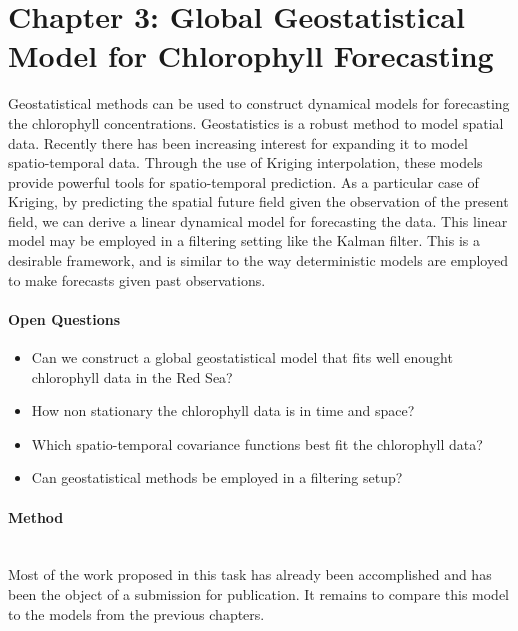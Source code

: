 \section{Chapter 3: Global Geostatistical Model for Chlorophyll Forecasting}

Geostatistical methods can be used to construct dynamical models for
forecasting the chlorophyll concentrations. Geostatistics is a robust method to
model spatial data.  Recently there has been increasing interest for expanding
it to model spatio-temporal data. Through the use of Kriging interpolation,
these models provide powerful tools for spatio-temporal prediction. As a
particular case of Kriging, by predicting the spatial future field given the
observation of the present field, we can derive a linear dynamical model for
forecasting the data. This linear model may be employed in a filtering setting
like the Kalman filter. This is a desirable framework, and is similar to the
way deterministic models are employed to make forecasts given past
observations. 

\paragraph{Open Questions}

\begin{itemize}

\item Can we construct a global geostatistical model that fits well enought
chlorophyll data in the Red Sea?

\item How non stationary the chlorophyll data is in time and space?

\item Which spatio-temporal covariance functions best fit the chlorophyll data?

\item Can geostatistical methods be employed in a filtering setup?

\end{itemize}

\paragraph{Method} 
\mbox{}\\

Most of the work proposed in this task has already been accomplished and has
been the object of a submission for publication. It remains to compare this
model to the models from the previous chapters.

